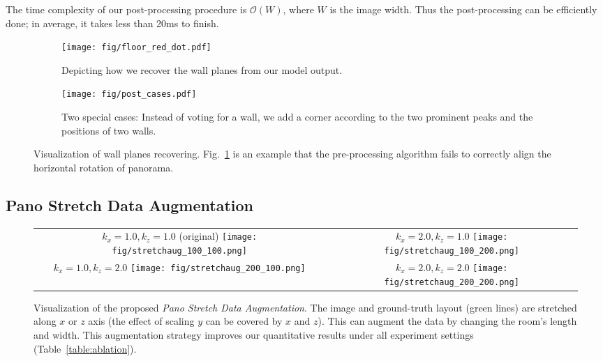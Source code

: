 \documentclass[10pt,twocolumn,letterpaper]{article}
\begin{document}
The time complexity of our post-processing procedure is $\mathcal{O}(W)$, where $W$ is the image width. Thus the post-processing can be efficiently done; in average, it takes less than 20ms to finish.

\begin{figure}[h]
    \centering
    \begin{subfigure}[b]{0.96\linewidth}
        \centering
        \texttt{[image: fig/floor\_red\_dot.pdf]}
        \caption{Depicting how we recover the wall planes from our model output.}
        \label{fig:post_walls_a}
    \end{subfigure}
    \begin{subfigure}[b]{0.96\linewidth}
        \centering
        \texttt{[image: fig/post\_cases.pdf]}
        \caption{Two special cases: Instead of voting for a wall, we add a corner according to the two prominent peaks and the positions of two walls.}
        \label{fig:post_walls_b}
    \end{subfigure}
    \caption{Visualization of wall planes recovering. Fig.~\ref{fig:post_walls_a} is an example that the pre-processing algorithm fails to correctly align the horizontal rotation of panorama.}
    \label{fig:post_walls}
\end{figure}
 \subsection{Pano Stretch Data Augmentation} \label{sssec:approach_aug}



\begin{figure}
   \centering
   \setlength\tabcolsep{1pt}
\begin{tabular}{cc}
\makecell{$k_x=1.0, k_z=1.0$  (original)\\\texttt{[image: fig/stretchaug\_100\_100.png]}}&
\makecell{$k_x=2.0, k_z=1.0$\\\texttt{[image: fig/stretchaug\_100\_200.png]}}\\
\makecell{$k_x=1.0, k_z=2.0$\\\texttt{[image: fig/stretchaug\_200\_100.png]}}&
\makecell{$k_x=2.0, k_z=2.0$\\\texttt{[image: fig/stretchaug\_200\_200.png]}}\\
\end{tabular}

    \caption{Visualization of the proposed \textit{Pano Stretch Data Augmentation}. The image and ground-truth layout (green lines) are stretched along $x$ or $z$ axis (the effect of scaling $y$ can be covered by $x$ and $z$). This can augment the data by changing the room's length and width. This augmentation strategy improves our quantitative results under all experiment settings (Table~\ref{table:ablation}).
}
    \label{fig:stretch_aug_demo}
\end{figure}
\end{document}
